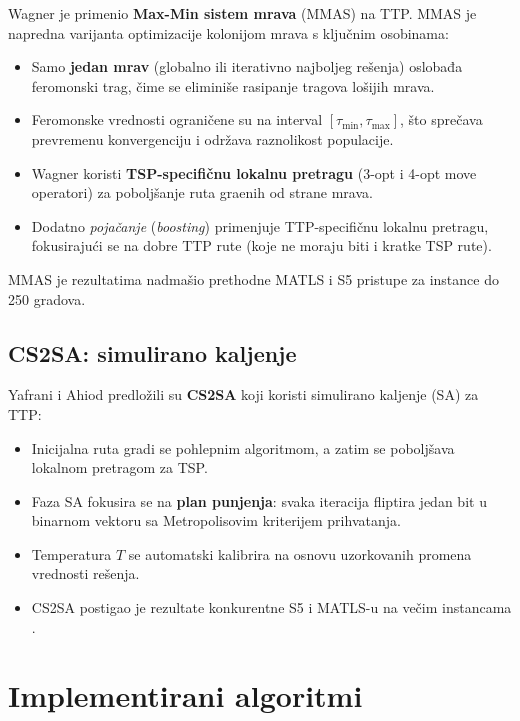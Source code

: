 \documentclass[12pt,a4paper]{article}
\begin{document}
Wagner \cite{wagner2016} je primenio \textbf{Max-Min sistem mrava} (MMAS) na TTP. MMAS je napredna varijanta optimizacije kolonijom mrava s klju\v{c}nim osobinama:
\begin{itemize}
    \item Samo \textbf{jedan mrav} (globalno ili iterativno najboljeg re\v{s}enja) oslobađa feromonski trag, čime se eliminiše rasipanje tragova lo\v{s}ijih mrava.
    \item Feromonske vrednosti ograni\v{c}ene su na interval $[\tau_{\min}, \tau_{\max}]$, što spre\v{c}ava prevremenu konvergenciju i odr\v{z}ava raznolikost populacije.
    \item Wagner koristi \textbf{TSP-specifi\v{c}nu lokalnu pretragu} (3-opt i 4-opt move operatori) za pobolj\v{s}anje ruta gra\dj{}enih od strane mrava.
    \item Dodatno \textit{poja\v{c}anje} (\textit{boosting}) primenjuje TTP-specifi\v{c}nu lokalnu pretragu, fokusiraju\'{c}i se na dobre TTP rute (koje ne moraju biti i kratke TSP rute).
\end{itemize}
MMAS je rezultatima nadma\v{s}io prethodne MATLS i S5 pristupe za instance do 250 gradova.

\subsection{CS2SA: simulirano kaljenje}

Yafrani i Ahiod \cite{yafrani2016} predlo\v{z}ili su \textbf{CS2SA} koji koristi simulirano kaljenje (SA) za TTP:
\begin{itemize}
    \item Inicijalna ruta gradi se pohlepnim algoritmom, a zatim se pobolj\v{s}ava lokalnom pretragom za TSP.
    \item Faza SA fokusira se na \textbf{plan punjenja}: svaka iteracija fliptira jedan bit u binarnom vektoru sa Metropolisovim kriterijem prihvatanja.
    \item Temperatura $T$ se automatski kalibrira na osnovu uzorkovanih promena vrednosti re\v{s}enja.
    \item CS2SA postigao je rezultate konkurentne S5 i MATLS-u na ve\v{c}im instancama \cite{wagner_selection}.
\end{itemize}

\section{Implementirani algoritmi}
\end{document}
